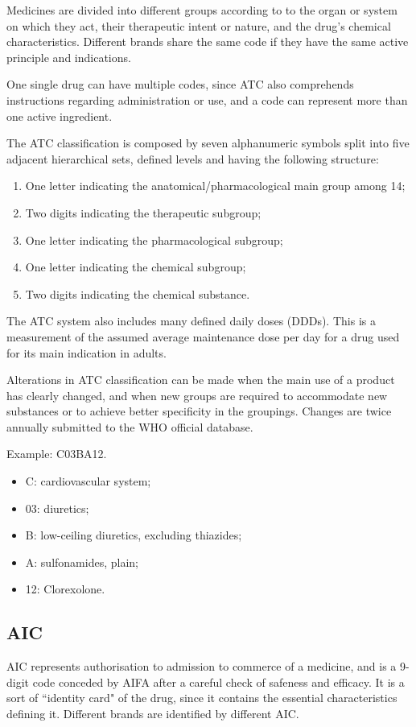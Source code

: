 Medicines are divided into different groups according to to the organ or system on which they act, their therapeutic intent or nature, and the drug's chemical characteristics. Different brands share the same code if they have the same active principle and indications.

One single drug can have multiple codes, since ATC also comprehends instructions regarding administration or use, and a code can represent more than one active ingredient.

The ATC classification is composed by seven alphanumeric symbols split into five adjacent hierarchical sets, defined levels and having the following structure\cite{atclevels}:
\begin{enumerate}
	\item One letter indicating the anatomical/pharmacological main group among 14;
	\item Two digits indicating the therapeutic subgroup;
	\item One letter indicating the pharmacological subgroup;
	\item One letter indicating the chemical subgroup;
	\item Two digits indicating the chemical substance.
\end{enumerate}

The ATC system also includes many defined daily doses (DDDs). This is a measurement of the assumed average maintenance dose per day for a drug used for its main indication in adults.

Alterations in ATC classification can be made when the main use of a product has clearly changed, and when new groups are required to accommodate new substances or to achieve better specificity in the groupings. Changes are twice annually submitted to the WHO official database.

Example: C03BA12.
\begin{itemize}
	\item C: cardiovascular system;
		\item 03: diuretics;
			\item B: low-ceiling diuretics, excluding thiazides;
				\item A: sulfonamides, plain;
					\item 12: Clorexolone.
\end{itemize}

\subsection{AIC}
AIC represents authorisation to admission to commerce of a medicine, and is a 9-digit code conceded by AIFA after a careful check of safeness and efficacy. It is a sort of ``identity card" of the drug, since it contains the essential characteristics defining it\cite{aicdef}. Different brands are identified by different AIC.

